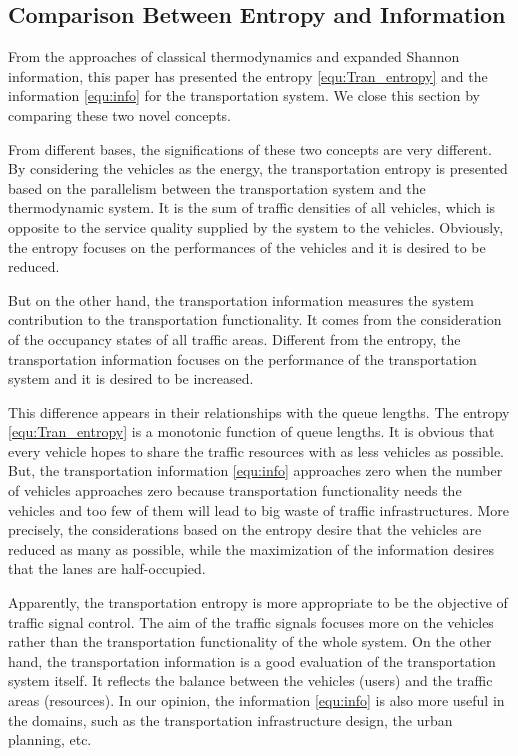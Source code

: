 \documentclass[preprint,authoryear,12pt]{elsarticle}
\begin{document}
\subsection{Comparison Between Entropy and Information}


From the approaches of classical thermodynamics and expanded Shannon
information, this paper has presented the entropy
\eqref{equ:Tran_entropy} and the information \eqref{equ:info} for the
transportation system. We close this section by comparing these two
novel concepts.

From different bases, the significations of these two concepts are
very different. By considering the vehicles as the energy, the
transportation entropy is presented based on the parallelism between
the transportation system and the thermodynamic system. It is the sum
of traffic densities of all vehicles, which is opposite to the
service quality supplied by the system to the vehicles. Obviously,
the entropy focuses on the performances of the vehicles and it is
desired to be reduced.

But on the other hand, the transportation information measures the
system contribution to the transportation functionality. It comes
from the consideration of the occupancy states of all traffic areas.
Different from the entropy, the transportation information focuses on
the performance of the transportation system and it is desired to be
increased.

This difference appears in their relationships with the queue
lengths. The entropy \eqref{equ:Tran_entropy} is a monotonic function
of queue lengths. It is obvious that every vehicle hopes to share the
traffic resources with as less vehicles as possible. But, the
transportation information \eqref{equ:info} approaches zero when the
number of vehicles approaches zero because transportation
functionality needs the vehicles and too few of them will lead to big
waste of traffic infrastructures. More precisely, the considerations
based on the entropy desire that the vehicles are reduced as many as
possible, while the maximization of the information desires that the
lanes are half-occupied.

Apparently, the transportation entropy is more appropriate to be the
objective of traffic signal control. The aim of the traffic signals
focuses more on the vehicles rather than the transportation
functionality of the whole system. On the other hand, the
transportation information is a good evaluation of the transportation
system itself. It reflects the balance between the vehicles (users)
and the traffic areas (resources). In our opinion, the information
\eqref{equ:info} is also more useful in the domains, such as the
transportation infrastructure design, the urban planning, etc.
\end{document}
